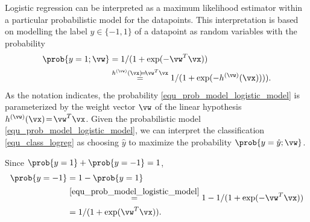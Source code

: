 \documentclass[12pt]{report}
\begin{document}
Logistic regression can be interpreted as a maximum likelihood 
estimator within a particular probabilistic model for the datapoints. 
This interpretation is based on modelling the label $y \in \{-1,1\}$ of a 
datapoint as random variables with the probability %
\begin{align}
\label{equ_prob_model_logistic_model}
\prob{y=1;\vw}& = 1/(1 + \exp(- \vw^{T} \vx) )  \nonumber \\
& \stackrel{h^{(\vw)}(\vx)\!=\!\vw^{T} \vx}{=} 1/(1 + \exp(- h^{(\vw)}(\vx))) )  . 
\end{align} 
As the notation indicates, the probability \eqref{equ_prob_model_logistic_model} 
is parameterized by the weight vector $\vw$ of the linear hypothesis $h^{(\vw)}(\vx)\!=\!\vw^{T} \vx$. 
Given the probabilistic model \eqref{equ_prob_model_logistic_model}, we 
can interpret the classification \eqref{equ_class_logreg} as choosing $\hat{y}$ 
to maximize the probability $\prob{y=\hat{y};\vw}$. 


Since $\prob{y=1} + \prob{y=-1}=1$, 
\begin{align}
\label{equ_prob_model_logistic_model_minus_1}
\prob{y=-1} & =  1 - \prob{y=1} \nonumber \\
& \stackrel{\eqref{equ_prob_model_logistic_model}}{=} 1 - 1/(1+ \exp(-\vw^{T} \vx)) \nonumber \\
& = 1/(1+ \exp(\vw^{T} \vx)).
\end{align}
 
\end{document}

